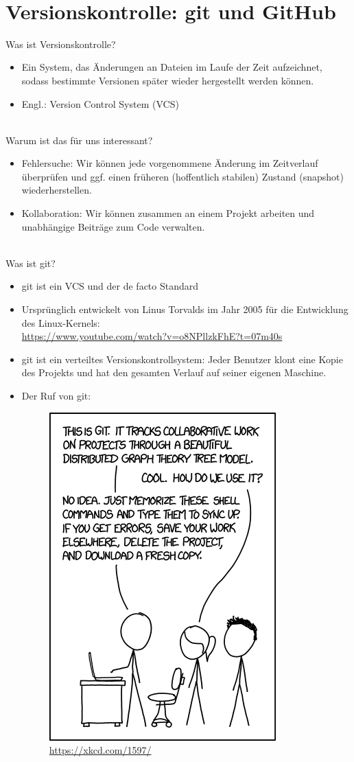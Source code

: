 \newpage~\\
\section{Versionskontrolle: git und GitHub}

Was ist Versionskontrolle?
\begin{itemize}
	\item Ein System, das Änderungen an Dateien im Laufe der Zeit aufzeichnet, sodass bestimmte Versionen später wieder hergestellt werden können.
	\item Engl.: Version Control System (VCS)
\end{itemize}
%
~\\
Warum ist das für uns interessant?
\begin{itemize}
	\item Fehlersuche: Wir können jede vorgenommene Änderung im Zeitverlauf überprüfen und ggf. einen früheren (hoffentlich stabilen) Zustand (snapshot) wiederherstellen.
	\item Kollaboration: Wir können zusammen an einem Projekt arbeiten und unabhängige Beiträge zum Code verwalten.
\end{itemize}
~\\
Was ist git?
\begin{itemize}
	\item git ist ein VCS und der de facto Standard
	\item Ursprünglich entwickelt von Linus Torvalds im Jahr 2005 für die Entwicklung des Linux-Kernels:\\ \url{https://www.youtube.com/watch?v=o8NPllzkFhE?t=07m40s}
	\item git ist ein verteiltes Versionskontrollsystem: Jeder Benutzer klont eine Kopie des Projekts und hat den gesamten Verlauf auf seiner eigenen Maschine.
	\item Der Ruf von git:
	\begin{figure}[h!]
		\centering
		\includegraphics[width=0.3\linewidth]{media/git}
		\caption{\url{https://xkcd.com/1597/}}
		\label{fig:git}
	\end{figure}
\end{itemize}







